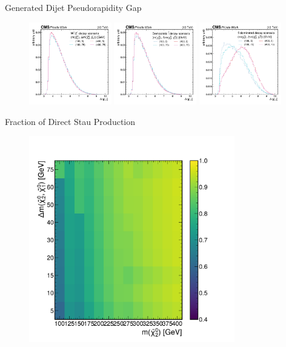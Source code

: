 \begin{frame}[fragile]{Generated Dijet Pseudorapidity Gap}
  \begin{figure}[htpb]
    \centering
    \includegraphics[width=0.32\textwidth]{fig/sig/Sig_wz_detajj.pdf}
    \includegraphics[width=0.32\textwidth]{fig/sig/Sig_democratic_detajj.pdf}
    \includegraphics[width=0.32\textwidth]{fig/sig/Sig_stau_detajj.pdf}
  \end{figure}	
\end{frame}

\begin{frame}[fragile]{Fraction of Direct Stau Production}
  	\begin{figure}[htpb]
  	  \centering
  	  \includegraphics[width=0.8\textwidth]{fig/sig/frac-stau.pdf}
  	\end{figure}
\end{frame}


